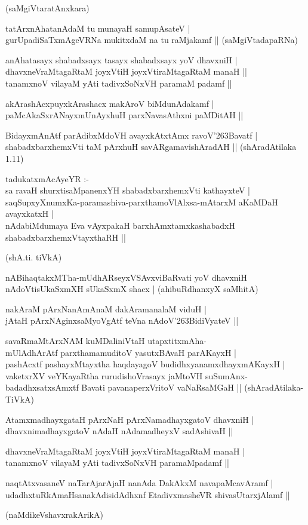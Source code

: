 \begin{itemize}
{\hfill{(saMgiVtaratAnxkara)} 
\item[47.] tatArxnAhatanAdaM tu munayaH samupAsateV |\\\label{151}
gurUpadiSaTxmAgeVRNa mukitxdaM na tu raMjakamf ||
\hfill{(saMgiVtadapaRNa)}
\item[48.] anAhatasayx shabadxsayx tasayx shabadxsayx yoV dhavxniH |\\\label{151}
dhavxneVraMtagaRtaM joyxVtiH joyxVtiraMtagaRtaM manaH ||\\
tanamxnoV vilayaM yAti tadivxSoNxVH paramaM padamf ||
\item[49.] akArashAcxpuyxkArashacx makAroV biMdunAdakamf |\\\label{151}
paMcAkaSxrANayxmUnAyxhuH parxNavasAthxni paMDitAH ||\label{161}
\item[50.] BidayxmAnAtf parAdibxMdoVH avayxkAtxtAmx ravoV\char'263Bavatf |\\\label{151}
shabadxbarxhemxVti taM pArxhuH savARgamavishAradAH ||
\hfill{(shAradAtilaka 1.11)}
\item[51.] tadukatxmAcAyeYR :-\\
sa ravaH shurxtisaMpanenxYH shabadxbarxhemxVti kathayxteV |\\\label{151}
saqSupxyXnumxKa-paramashiva-parxthamoVlAlxsa-mAtarxM aKaMDaH avayxkatxH |\\
nAdabiMdumaya Eva vAyxpakaH barxhAmxtamxkashabadxH shabadxbarxhemxVtayxthaRH ||

\hfill{(shA.ti. tiVkA)}
\item[52.] nABihaqtakxMTha-mUdhARseyxVSAvxviBaRvati yoV dhavxniH \\\label{151}
nAdoVtisUkaSxmXH sUkaSxmX shacx |
\hfill{(ahibuRdhanxyX saMhitA)}
\item[53.] nakAraM pArxNanAmAnaM dakAramanalaM viduH |\\\label{151}
jAtaH pArxNAginxsaMyoVgAtf teVna nAdoV\char'263BidiVyateV ||
\item[54.] savaRmaMtArxNAM kuMDaliniVtaH utapxtitxmAha-\\[3pt]
mUlAdhArAtf parxthamamuditoV yasutxBAvaH parAKayxH |\\\label{152}
pashAcxtf pashayxMtayxtha haqdayagoV budidhxyanamxdhayxmAKayxH |\\
vaketxrXV veYKayaRtha rurudishoVrasayx jaMtoVH suSumAnx-\\
badadhxsatxsAmxtf Bavati pavanaperxVritoV vaNaRsaMGaH ||
\hfill{(shAradAtilaka- TiVkA)}
\item[55.] AtamxmadhayxgataH pArxNaH pArxNamadhayxgatoV dhavxniH |\\\label{152}
dhavxnimadhayxgatoV nAdaH nAdamadheyxV sadAshivaH ||
\item[56.] dhavxneVraMtagaRtaM joyxVtiH joyxVtiraMtagaRtaM manaH |\\
tanamxnoV vilayaM yAti tadivxSoNxVH paramaMpadamf ||
\item[57.] naqtAtxvasaneV naTarAjarAjaH nanAda DakAkxM navapaMcavAramf |\\\label{152}
udadhxtuRkAmaHsanakAdisidAdhxnf EtadivxmasheVR shivasUtarxjAlamf ||

\hfill{(naMdikeVshavxrakArikA)}}
\end{itemize}
